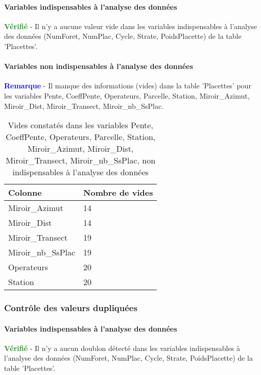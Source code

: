 \documentclass[a4paper]{article}
\begin{document}
\paragraph{Variables indispensables à l'analyse des données}
\textcolor{ForestGreen}{\textbf{Vérifié}} - Il n'y a aucune valeur vide dans les variables indispensables à l'analyse des données (NumForet, NumPlac, Cycle, Strate, PoidsPlacette) de la table 'Placettes'. \\ 

\paragraph{Variables non indispensables à l'analyse des données}
\textcolor{blue}{\textbf{Remarque}} - Il manque des informations (vides) dans la table 'Placettes' pour les variables Pente, CoeffPente, Operateurs, Parcelle, Station, Miroir\_Azimut, Miroir\_Dist, Miroir\_Transect, Miroir\_nb\_SsPlac. \\ 

\begin{table}[ht]
\centering
\begingroup\scriptsize
\begin{tabular}{|M{2cm}|M{1cm}|}
  \hline
Colonne & Nombre de vides \\ 
  \hline
Miroir\_Azimut & 14 \\ 
   \hline
Miroir\_Dist & 14 \\ 
   \hline
Miroir\_Transect & 19 \\ 
   \hline
Miroir\_nb\_SsPlac & 19 \\ 
   \hline
Operateurs & 20 \\ 
   \hline
Station & 20 \\ 
   \hline
\end{tabular}
\endgroup
\caption{\footnotesize{Vides constatés dans les variables Pente, CoeffPente, Operateurs, Parcelle, Station, Miroir\_Azimut, Miroir\_Dist, Miroir\_Transect, Miroir\_nb\_SsPlac, non indispensables à l'analyse des données}} 
\label{Placettes-missing_values_for_non_essential_vars}
\end{table}
\FloatBarrier
\subsubsection{Contrôle des valeurs dupliquées}
\paragraph{Variables indispensables à l'analyse des données}
\textcolor{ForestGreen}{\textbf{Vérifié}} - Il n'y a aucun doublon détecté dans les variables indispensables à l'analyse des données (NumForet, NumPlac, Cycle, Strate, PoidsPlacette) de la table 'Placettes'. \\ 
\end{document}
